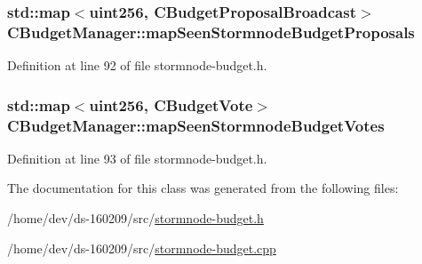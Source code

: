 \subsubsection[{map\+Seen\+Stormnode\+Budget\+Proposals}]{\setlength{\rightskip}{0pt plus 5cm}std\+::map$<${\bf uint256}, {\bf C\+Budget\+Proposal\+Broadcast}$>$ C\+Budget\+Manager\+::map\+Seen\+Stormnode\+Budget\+Proposals}\label{class_c_budget_manager_a5336c99bc4c72c185de0391165a67159}


Definition at line 92 of file stormnode-\/budget.\+h.

\hypertarget{class_c_budget_manager_af729951208566289252458a01ed9fc7a}{}
\subsubsection[{map\+Seen\+Stormnode\+Budget\+Votes}]{\setlength{\rightskip}{0pt plus 5cm}std\+::map$<${\bf uint256}, {\bf C\+Budget\+Vote}$>$ C\+Budget\+Manager\+::map\+Seen\+Stormnode\+Budget\+Votes}\label{class_c_budget_manager_af729951208566289252458a01ed9fc7a}


Definition at line 93 of file stormnode-\/budget.\+h.



The documentation for this class was generated from the following files\+:\begin{DoxyCompactItemize}
\item 
/home/dev/ds-\/160209/src/\hyperlink{stormnode-budget_8h}{stormnode-\/budget.\+h}\item 
/home/dev/ds-\/160209/src/\hyperlink{stormnode-budget_8cpp}{stormnode-\/budget.\+cpp}\end{DoxyCompactItemize}
